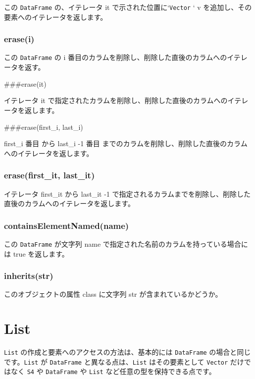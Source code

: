 \documentclass[]{book}
\begin{document}
この \texttt{DataFrame} の、イテレータ it で示された位置に`\texttt{Vector} ` v を追加し、その要素へのイテレータを返します。

\hypertarget{erasei-1}{%
\subsection{erase(i)}\label{erasei-1}}

この \texttt{DataFrame} の i 番目のカラムを削除し、削除した直後のカラムへのイテレータを返す。

\#\#\#erase(it)

イテレータ it で指定されたカラムを削除し、削除した直後のカラムへのイテレータを返します。

\#\#\#erase(first\_i, last\_i)

first\_i 番目 から last\_i -1 番目 までのカラムを削除し、削除した直後のカラムへのイテレータを返します。

\hypertarget{erasefirst_it-last_it}{%
\subsection{erase(first\_it, last\_it)}\label{erasefirst_it-last_it}}

イテレータ first\_it から last\_it -1 で指定されるカラムまでを削除し、削除した直後のカラムへのイテレータを返します。

\hypertarget{containselementnamedname-1}{%
\subsection{containsElementNamed(name)}\label{containselementnamedname-1}}

この \texttt{DataFrame} が文字列 name で指定された名前のカラムを持っている場合には true を返します。

\hypertarget{inheritsstr}{%
\subsection{inherits(str)}\label{inheritsstr}}

このオブジェクトの属性 class に文字列 str が含まれているかどうか。

\hypertarget{list}{%
\chapter{List}\label{list}}

\texttt{List} の作成と要素へのアクセスの方法は、基本的には \texttt{DataFrame} の場合と同じです。\texttt{List} が \texttt{DataFrame} と異なる点は、\texttt{List} はその要素として \texttt{Vector} だけではなく \texttt{S4} や \texttt{DataFrame} や \texttt{List} など任意の型を保持できる点です。
\end{document}
